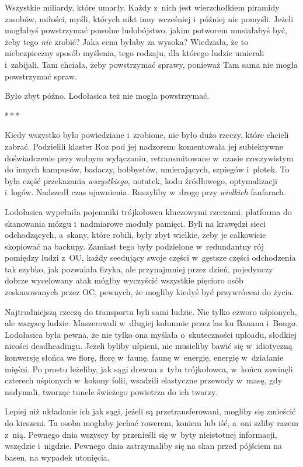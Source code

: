 \documentclass[oneside,polish,11pt,sfheadings]{mwbk}
\newcommand{\threeast}{\bigskip\par\centerline{*\,*\,*}\medskip\par}
\begin{document}
Wszystkie miliardy, które umarły. Każdy z~nich jest wierzchołkiem
piramidy zasobów, miłości, myśli, których nikt inny wcześniej i~później
nie pomyśli. Jeżeli mogłabyś powstrzymać powolne ludobójstwo, jakim
potworem musiałabyś być, żeby tego \textit{nie} zrobić? Jaka cena byłaby
za wysoka? Wiedziała, że to niebezpieczny sposób myślenia, tego rodzaju,
dla którego ludzie umierali i~zabijali. Tam chciała, żeby powstrzymać
sprawy, ponieważ Tam sama nie mogła powstrzymać spraw.

Było zbyt późno. Lodołasica też nie mogła powstrzymać.

\threeast

Kiedy wszystko było powiedziane i~zrobione, nie było dużo rzeczy, które
chcieli zabrać. Podzielili klaster Roz pod jej nadzorem: komentowała jej
subiektywne doświadczenie przy wolnym wyłączaniu, retransmitowane w~czasie rzeczywistym do innych kampusów, badaczy, hobbystów,
umierających, szpiegów i~plotek. To była część przekazania
\textit{wszystkiego}, notatek, kodu źródłowego, optymalizacji i~logów.
Nadszedł czas ujawnienia. Ruszyliby w~drogę przy \textit{wielkich}
fanfarach.

Lodołasica wypełniła pojemniki trójkołowca kluczowymi rzeczami,
platforma do skanowania mózgu i~nadmiarowe moduły pamięci. Byli na
krawędzi sieci odchodzących, a~skany, które robili, były zbyt wielkie,
żeby je całkowicie skopiować na backupy. Zamiast tego były podzielone w~redundantny rój pomiędzy ludzi z~OU, każdy seedujący swoje części w~gęstsze części odchodzenia tak szybko, jak pozwalała fizyka, ale
przynajmniej przez dzień, pojedynczy dobrze wycelowany atak mógłby
wyczyścić wszystkie pięcioro osób zeskanowanych przez OC, pewnych, że
mogliby kiedyś być przywróceni do życia.

Najtrudniejszą rzeczą do transportu byli sami ludzie. Nie tylko czworo
uśpionych, ale \textit{wszyscy} ludzie. Maszerowali w~długiej kolumnie
przez las ku Banana i~Bongo. Lodołasica była pewna, że nie tylko ona
myślała o~skuteczności uploadu, słodkiej nicości deadheadingu. Jeżeli
byliby uśpieni, nie musieliby bawić się w~idiotyczną konwersję słońca we
florę, florę w~faunę, faunę w~energię, energię w~działanie mięśni. Po
prostu leżeliby, jak sągi drewna z~tyłu trójkołowca, w~końcu zawinęli
czterech uśpionych w~kokony folii, wsadzili elastyczne przewody w~masę,
gdy nadymali, tworząc tunele świeżego powietrza do ich twarzy.

Lepiej niż układanie ich jak sągi, jeżeli są przetransferowani, mogliby
się zmieścić do kieszeni. Ta osoba mogłaby jechać rowerem, koniem lub
iść, a~oni szliby razem z~nią. Pewnego dnia wszyscy by przenieśli się w~byty nieistotnej informacji, wszędzie i~nigdzie. Pewnego dnia
zatrzymaliby się na skan przed pójściem na basen, na wypadek utonięcia.
\end{document}
